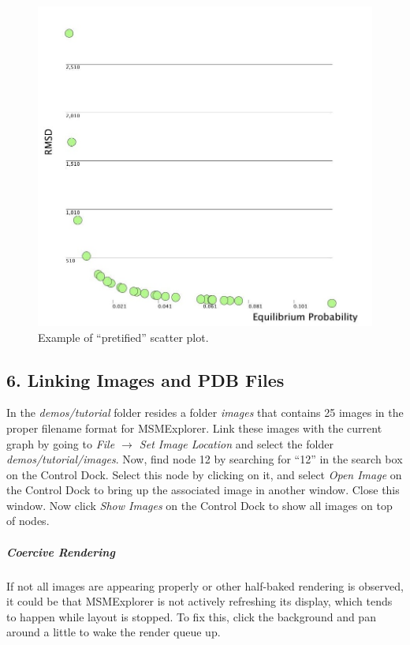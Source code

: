 \documentclass[10pt,a4paper]{report}
\begin{document}
\begin{figure}[h]
\includegraphics[scale=.3]{tut0.jpg}
\caption{Example of ``pretified'' scatter plot.}
\end{figure}

\subsection*{6. Linking Images and PDB Files}
In the \emph{demos/tutorial} folder resides a folder \emph{images} that contains 25 images in the proper filename format for MSMExplorer. Link these images with the current graph by going to \emph{File $\rightarrow$ Set Image Location} and select the folder \emph{demos/tutorial/images}. Now, find node 12 by searching for ``12'' in the search box on the Control Dock. Select this node by clicking on it, and select \emph{Open Image} on the Control Dock to bring up the associated image in another window. Close this window. Now click \emph{Show Images} on the Control Dock to show all images on top of nodes. 

\subparagraph*{Coercive Rendering}
If not all images are appearing properly or other half-baked rendering is observed, it could be that MSMExplorer is not actively refreshing its display, which tends to happen while layout is stopped. To fix this, click the background and pan around a little to wake the render queue up.
\end{document}
